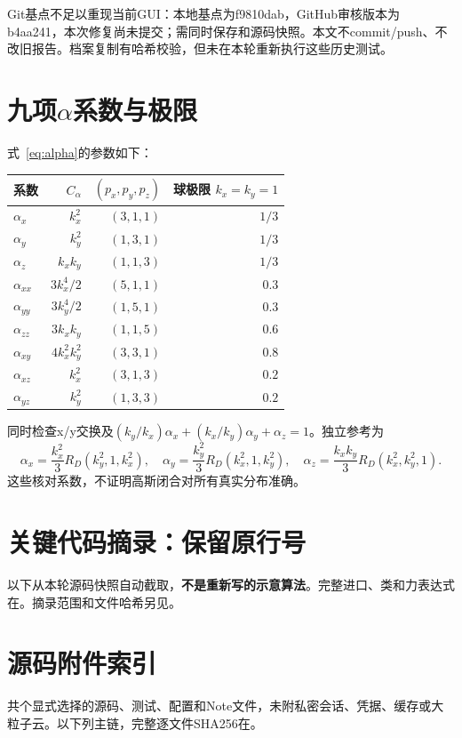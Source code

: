Git基点不足以重现当前GUI：本地基点为f9810dab，GitHub审核版本为b4aa241，本次修复尚未提交；需同时保存和源码快照。本文不commit/push、不改旧报告。档案复制有哈希校验，但未在本轮重新执行这些历史测试。

\section{九项\texorpdfstring{$\alpha$}{alpha}系数与极限}\label{app:alpha}
式~\eqref{eq:alpha}的参数如下：
\begin{center}\begin{tabular}{lrrr}\toprule
系数 & $C_\alpha$ & $(p_x,p_y,p_z)$ & 球极限 $k_x=k_y=1$ \\ \midrule
$\alpha_x$ & $k_x^2$ & $(3,1,1)$ & $1/3$ \\
$\alpha_y$ & $k_y^2$ & $(1,3,1)$ & $1/3$ \\
$\alpha_z$ & $k_xk_y$ & $(1,1,3)$ & $1/3$ \\
$\alpha_{xx}$ & $3k_x^4/2$ & $(5,1,1)$ & $0.3$ \\
$\alpha_{yy}$ & $3k_y^4/2$ & $(1,5,1)$ & $0.3$ \\
$\alpha_{zz}$ & $3k_xk_y$ & $(1,1,5)$ & $0.6$ \\
$\alpha_{xy}$ & $4k_x^2k_y^2$ & $(3,3,1)$ & $0.8$ \\
$\alpha_{xz}$ & $k_x^2$ & $(3,1,3)$ & $0.2$ \\
$\alpha_{yz}$ & $k_y^2$ & $(1,3,3)$ & $0.2$ \\
\bottomrule\end{tabular}\end{center}
同时检查x/y交换及$(k_y/k_x)\alpha_x+(k_x/k_y)\alpha_y+\alpha_z=1$。独立参考为
\begin{equation}
 \alpha_x=\frac{k_x^2}{3}R_D(k_y^2,1,k_x^2),\quad
 \alpha_y=\frac{k_y^2}{3}R_D(k_x^2,1,k_y^2),\quad
 \alpha_z=\frac{k_xk_y}{3}R_D(k_x^2,k_y^2,1).
\end{equation}
这些核对系数，不证明高斯闭合对所有真实分布准确。

\section{关键代码摘录：保留原行号}\label{app:code}
以下从本轮源码快照自动截取，\textbf{不是重新写的示意算法}。完整进口、类和力表达式在。摘录范围和文件哈希另见。


\clearpage\section{源码附件索引}\label{app:source}
共\SourceCount{}个显式选择的源码、测试、配置和Note文件，未附私密会话、凭据、缓存或大粒子云。以下列主链，完整逐文件SHA256在。
\begingroup\small\renewcommand{\arraystretch}{1.08}\endgroup
